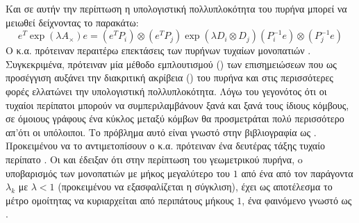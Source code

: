 Και σε αυτήν την περίπτωση η υπολογιστική πολλυπλοκότητα του πυρήνα μπορεί να μειωθεί δείχνοντας το παρακάτω:
\begin{equation}
    e^T\exp(\lambda A_{\times}) e = (e^T P_{i}) \otimes (e^T P_{j})\exp(\lambda D_{i} \otimes D_{j}) (P_{i}^{-1} e) \otimes (P_{j}^{-1} e)
\end{equation}
Ο  κ.α. πρότειναν περαιτέρω επεκτάσεις των πυρήνων τυχαίων μονοπατιών \cite{mahe2004extensions}.
Συγκεκριμένα, πρότειναν μία μέθοδο εμπλουτισμού () των επισημειώσεων που ως προσέγγιση αυξάνει την διακριτική ακρίβεια () του πυρήνα και στις περισσότερες φορές ελλατώνει την υπολογιστική πολλυπλοκότητα.
Λόγω του γεγονότος ότι οι τυχαίοι περίπατοι μπορούν να συμπεριλαμβάνουν ξανά και ξανά τους ίδιους κόμβους, σε όμοιους γράφους ένα κύκλος μεταξύ κόμβων θα προσμετράται πολύ περισσότερο απ'ότι οι υπόλοιποι. Το πρόβλημα αυτό είναι γνωστό στην βιβλιογραφία ως .
Προκειμένου να το αντιμετοπίσουν ο  κ.α. πρότειναν ένα δευτέρας τάξης τυχαίο περίπατο .
Οι  και  έδειξαν ότι στην περίπτωση του γεωμετρικού πυρήνα, o υποβαρισμός των μονοπατιών με μήκος μεγαλύτερο του $1$ από ένα από τον παράγοντα $λ_{k}$ με $λ<1$ (προκειμένου να εξασφαλίζεται η σύγκλιση), έχει ως αποτέλεσμα το μέτρο ομοίτητας να κυριαρχείται από περιπάτους μήκους $1$, ένα φαινόμενο γνωστό ως  \cite{sugiyama2015halting}.

